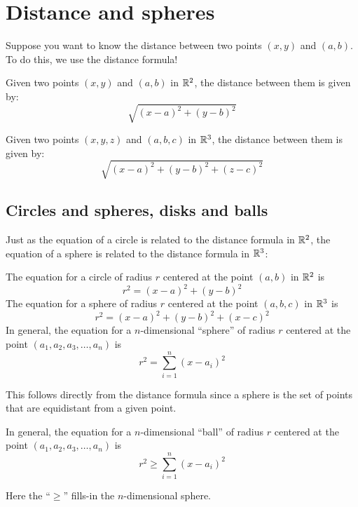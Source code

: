 \documentclass{ximera}
\begin{document}
\section{Distance and spheres}

Suppose you want to know the distance between two points $(x,y)$ and
$(a,b)$. To do this, we use the distance formula!
\begin{theorem}
  Given two points $(x,y)$ and $(a,b)$ in $\mathbb R^2$, the distance between
  them is given by:
  \[
  \sqrt{(x-a)^2 + (y-b)^2}
  \]
\end{theorem}

\begin{theorem}
  Given two points $(x,y,z)$ and $(a,b,c)$ in $\mathbb R^3$, the distance between
  them is given by:
  \[
  \sqrt{(x-a)^2 + (y-b)^2 + (z-c)^2}
  \]
\end{theorem}






\subsection{Circles and spheres, disks and balls}

Just as the equation of a circle is related to the distance formula in
$\mathbb R^2$, the equation of a sphere is related to the distance formula in
$\mathbb R^3$:


\begin{theorem}
  The equation for a circle of radius $r$ centered at the point
  $(a,b)$ in $\mathbb R^2$ is
  \[
  r^2=(x-a)^2 + (y-b)^2
  \]
  The equation for a sphere of radius $r$ centered at the point
  $(a,b,c)$ in $\mathbb R^3$ is
  \[
  r^2 = (x-a)^2 + (y-b)^2 + (x-c)^2
  \]
  In general, the equation for a $n$-dimensional ``sphere'' of radius
  $r$ centered at the point $(a_1,a_2,a_3,\dots,a_n)$ is
  \[
  r^2 = \sum_{i=1}^n(x-a_i)^2
  \]
  \begin{explanation}
    This follows directly from the distance formula since a sphere is
    the set of points that are equidistant from a given point.
  \end{explanation}
\end{theorem}

\begin{corollary}
  In general, the equation for a $n$-dimensional ``ball'' of radius
  $r$ centered at the point $(a_1,a_2,a_3,\dots,a_n)$ is
  \[
  r^2 \ge \sum_{i=1}^n(x-a_i)^2
  \]
  \begin{explanation}
    Here the ``$\ge$'' fills-in the $n$-dimensional sphere.
  \end{explanation}
\end{corollary}
\end{document}
